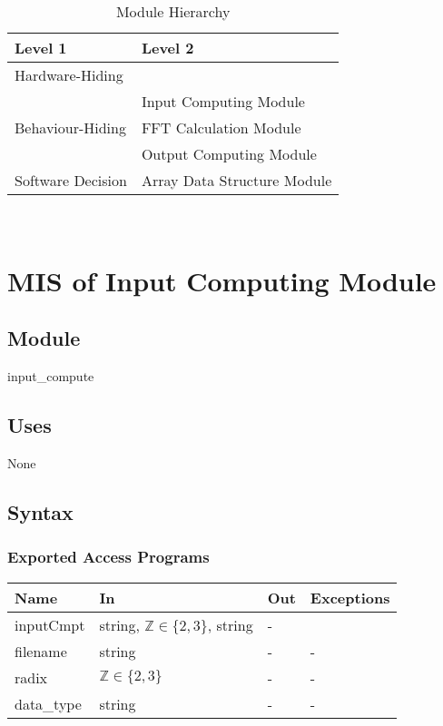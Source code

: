 \documentclass[12pt, titlepage]{article}
\begin{document}
\begin{table}[h!]
\centering
\begin{tabular}{p{} p{}}
\toprule
\textbf{Level 1} & \textbf{Level 2}\\
\midrule

{Hardware-Hiding} & ~ \\
\midrule

\multirow{3}{0.3\textwidth}{Behaviour-Hiding}
& Input Computing Module\\
& FFT Calculation Module\\
& Output Computing Module\\
\midrule

\multirow{1}{0.3\textwidth}{Software Decision} & Array Data Structure Module\\
\bottomrule

\end{tabular}
\caption{Module Hierarchy}
\label{TblMH}
\end{table}

\newpage
~\newpage

\section{MIS of Input Computing Module} \label{Input} 

\subsection{Module}

input\_compute

\subsection{Uses}
None
\subsection{Syntax}

\subsubsection{Exported Access Programs}

\begin{center}
\begin{tabular}{p{2cm} p{4cm} p{4cm} p{2cm}}
\hline
\textbf{Name} & \textbf{In} & \textbf{Out} & \textbf{Exceptions} \\
\hline
inputCmpt & string, $\mathbb{Z}\in\{2, 3\}$, string& - & \\
filename& string & - & -\\
radix&$\mathbb{Z} \in \{2, 3\}$ & - & -\\
data\_type& string& -&-\\

\hline
\end{tabular}
\end{center}
\end{document}
